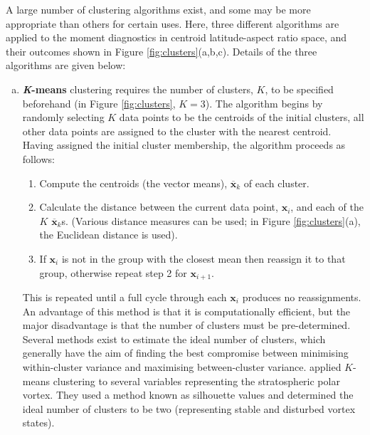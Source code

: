 A large number of clustering algorithms exist, and some may be more appropriate
than others for certain uses. Here, three different algorithms are applied to
the moment diagnostics in centroid latitude-aspect ratio space, and their
outcomes shown in Figure \ref{fig:clusters}(a,b,c). Details of the three
algorithms are given below:
\begin{enumerate}[(a)]
\item \textbf{\textit{K}-means} clustering requires the number of clusters, $K$,
  to be specified beforehand (in Figure \ref{fig:clusters}, $K=3$). The
  algorithm begins by randomly selecting $K$ data points to be the centroids of
  the initial clusters, all other data points are assigned to the cluster with
  the nearest centroid. Having assigned the initial cluster membership, the
  algorithm proceeds as follows:
  \begin{enumerate}[1.]
    \item Compute the centroids (the vector means), $\mathbf{\overline{x}}_k$
      of each cluster. 
    \item Calculate the distance between the current data point, $\mathbf{x}_i$,
      and each of the $K$ $\mathbf{\overline{x}}_k$s. (Various distance measures
      can be used; in Figure \ref{fig:clusters}(a), the Euclidean distance is
      used).
    \item If $\mathbf{x}_i$ is not in the group with the closest mean then
      reassign it to that group, otherwise repeat step 2 for $\mathbf{x}_{i+1}$.
  \end{enumerate}
  This is repeated until a full cycle through each $\mathbf{x}_i$ produces no
  reassignments. An advantage of this method is that it is computationally
  efficient, but the major disadvantage is that the number of clusters must be
  pre-determined. Several methods exist to estimate the ideal number of
  clusters, which generally have the aim of finding the best compromise between
  minimising within-cluster variance and maximising between-cluster
  variance. \citet{K.Coughlin2009} applied $K$-means clustering to several
  variables representing the stratospheric polar vortex. They used a method
  known as silhouette values \citep{Rousseeuw1987} and determined the ideal
  number of clusters to be two (representing stable and disturbed vortex
  states).



\end{enumerate}
